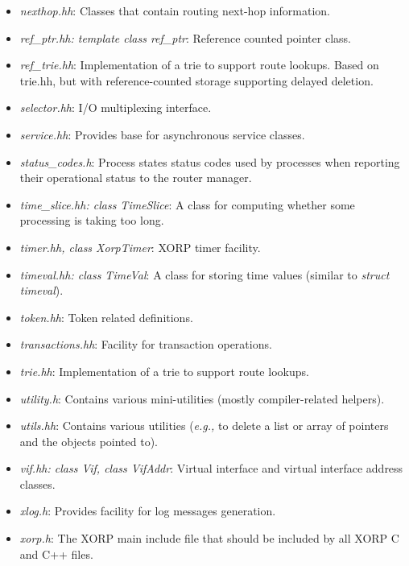 \documentclass[11pt]{article}
\newcommand{\eg}{\emph{e.g.,}\xspace}
\begin{document}
\begin{itemize}
  \item \emph{nexthop.hh}: Classes that contain routing next-hop
  information.

  \item \emph{ref\_ptr.hh: template class ref\_ptr}: Reference counted
  pointer class.

  \item \emph{ref\_trie.hh}: Implementation of a trie to support route
  lookups.  Based on trie.hh, but with reference-counted storage
  supporting delayed deletion.

  \item \emph{selector.hh}: I/O multiplexing interface.

  \item \emph{service.hh}: Provides base for asynchronous service classes.

  \item \emph{status\_codes.h}: Process states status codes used by
  processes when reporting their operational status to the router manager.

  \item \emph{time\_slice.hh: class TimeSlice}: A class for computing
  whether some processing is taking too long.

  \item \emph{timer.hh, class XorpTimer}: XORP timer facility.

  \item \emph{timeval.hh: class TimeVal}: A class for storing time values
  (similar to \emph{struct timeval}).

  \item \emph{token.hh}: Token related definitions.

  \item \emph{transactions.hh}: Facility for transaction operations.

  \item \emph{trie.hh}: Implementation of a trie to support route
  lookups.

  \item \emph{utility.h}: Contains various mini-utilities
  (mostly compiler-related helpers).

  \item \emph{utils.hh}: Contains various utilities (\eg to delete a
  list or array of pointers and the objects pointed to).

  \item \emph{vif.hh: class Vif, class VifAddr}: Virtual interface and
  virtual interface address classes.

  \item \emph{xlog.h}: Provides facility for log messages generation.

  \item \emph{xorp.h}: The XORP main include file that should be included
  by all XORP C and C++ files.

\end{itemize}
\end{document}
